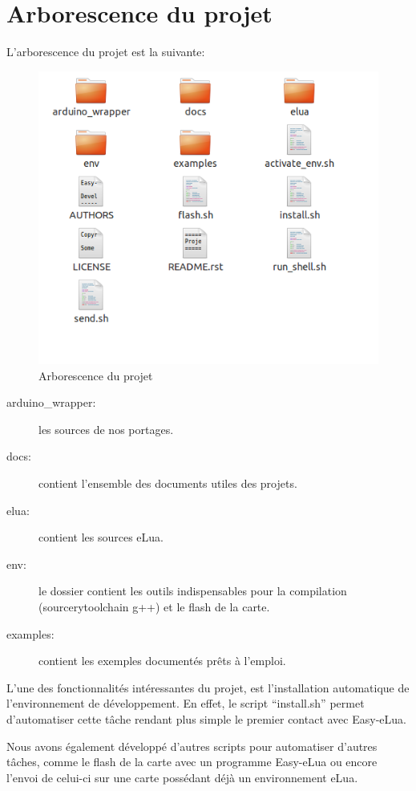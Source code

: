 \chapter[Arborescence du projet]{Arborescence du projet}
\label{chap:chap7}

L'arborescence du projet est la suivante:

\begin{figure}[h]
\begin{center}
\includegraphics[scale=0.6]{../images/arborescence.png}
\caption{Arborescence du projet}
\end{center}
\end{figure}

\begin{description}
 \item[arduino\_wrapper: ] les sources de nos portages.
 \item[docs: ] contient l’ensemble des documents utiles des projets.
 \item[elua: ] contient les sources eLua.
 \item[env: ] le dossier contient les outils indispensables pour la compilation (sourcerytoolchain g++) et le flash de la carte.
 \item[examples: ] contient les exemples documentés prêts à l’emploi.
\end{description}

L’une des fonctionnalités intéressantes du projet, est l’installation automatique de l’environnement de développement.
En effet, le script ``install.sh'' permet d’automatiser cette tâche rendant plus simple le premier contact avec Easy-eLua.

Nous avons également développé d’autres scripts pour automatiser d’autres tâches, comme le flash de la carte avec un programme
Easy-eLua ou encore l’envoi de celui-ci sur une carte possédant déjà un environnement eLua.
